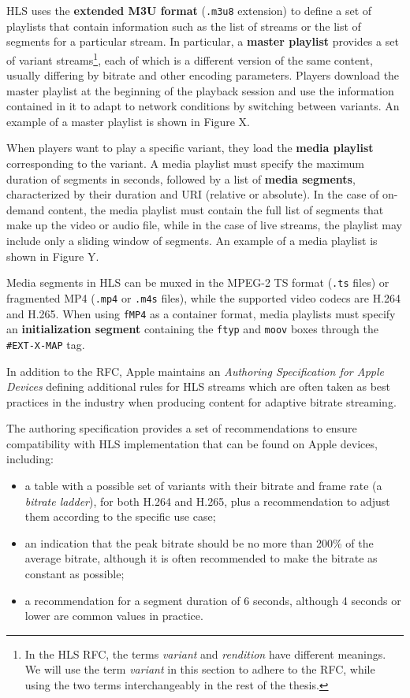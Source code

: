 HLS uses the \textbf{extended M3U format} (\texttt{.m3u8} extension) to define a set of playlists that contain information such as the list of streams or the list of segments for a particular stream. In particular, a \textbf{master playlist} provides a set of variant streams\footnote{In the HLS RFC, the terms \textit{variant} and \textit{rendition} have different meanings. We will use the term \textit{variant} in this section to adhere to the RFC, while using the two terms interchangeably in the rest of the thesis.}, each of which is a different version of the same content, usually differing by bitrate and other encoding parameters. Players download the master playlist at the beginning of the playback session and use the information contained in it to adapt to network conditions by switching between variants. An example of a master playlist is shown in Figure X.


When players want to play a specific variant, they load the \textbf{media playlist} corresponding to the variant. A media playlist must specify the maximum duration of segments in seconds, followed by a list of \textbf{media segments}, characterized by their duration and URI (relative or absolute). In the case of on-demand content, the media playlist must contain the full list of segments that make up the video or audio file, while in the case of live streams, the playlist may include only a sliding window of segments. An example of a media playlist is shown in Figure Y.

Media segments in HLS can be muxed in the MPEG-2 TS format (\texttt{.ts} files) or fragmented MP4 (\texttt{.mp4} or \texttt{.m4s} files), while the supported video codecs are H.264 and H.265. When using \texttt{fMP4} as a container format, media playlists must specify an \textbf{initialization segment} containing the \texttt{ftyp} and \texttt{moov} boxes through the \texttt{\#EXT-X-MAP} tag.

In addition to the RFC, Apple maintains an \textit{Authoring Specification for Apple Devices} defining additional rules for HLS streams which are often taken as best practices in the industry when producing content for adaptive bitrate streaming.

The authoring specification provides a set of recommendations to ensure compatibility with HLS implementation that can be found on Apple devices, including:

\begin{itemize}
    \item a table with a possible set of variants with their bitrate and frame rate (a \textit{bitrate ladder}), for both H.264 and H.265, plus a recommendation to adjust them according to the specific use case;
    \item an indication that the peak bitrate should be no more than 200\% of the average bitrate, although it is often recommended to make the bitrate as constant as possible;\cite{ozer}
    \item a recommendation for a segment duration of 6 seconds, although 4 seconds or lower are common values in practice.\cite{ozer}
\end{itemize}

